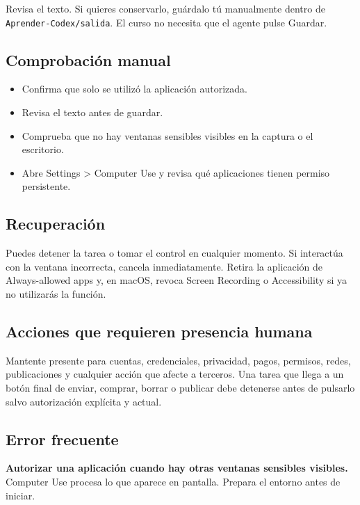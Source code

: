 \documentclass[10pt,a4paper,openany]{book}
\providecommand{\tightlist}{\setlength{\itemsep}{0.18em}\setlength{\parskip}{0pt}}
\begin{document}
Revisa el texto. Si quieres conservarlo, guárdalo tú manualmente dentro
de \texttt{Aprender-Codex/salida}. El curso no necesita que el agente
pulse Guardar.

\subsection{Comprobación manual}\label{comprobaciuxf3n-manual-5}

\begin{itemize}
\tightlist
\item
  Confirma que solo se utilizó la aplicación autorizada.
\item
  Revisa el texto antes de guardar.
\item
  Comprueba que no hay ventanas sensibles visibles en la captura o el
  escritorio.
\item
  Abre Settings \textgreater{} Computer Use y revisa qué aplicaciones
  tienen permiso persistente.
\end{itemize}

\subsection{Recuperación}\label{recuperaciuxf3n-7}

Puedes detener la tarea o tomar el control en cualquier momento. Si
interactúa con la ventana incorrecta, cancela inmediatamente. Retira la
aplicación de Always-allowed apps y, en macOS, revoca Screen Recording o
Accessibility si ya no utilizarás la función.

\subsection{Acciones que requieren presencia
humana}\label{acciones-que-requieren-presencia-humana}

Mantente presente para cuentas, credenciales, privacidad, pagos,
permisos, redes, publicaciones y cualquier acción que afecte a terceros.
Una tarea que llega a un botón final de enviar, comprar, borrar o
publicar debe detenerse antes de pulsarlo salvo autorización explícita y
actual.

\subsection{Error frecuente}\label{error-frecuente-9}

\textbf{Autorizar una aplicación cuando hay otras ventanas sensibles
visibles.} Computer Use procesa lo que aparece en pantalla. Prepara el
entorno antes de iniciar.
\end{document}
